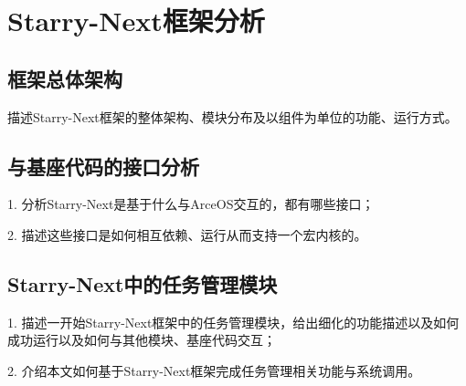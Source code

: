 
\chapter{Starry-Next框架分析}

\section{框架总体架构}

描述Starry-Next框架的整体架构、模块分布及以组件为单位的功能、运行方式。



\section{与基座代码的接口分析}

1. 分析Starry-Next是基于什么与ArceOS交互的，都有哪些接口；

2. 描述这些接口是如何相互依赖、运行从而支持一个宏内核的。



\section{Starry-Next中的任务管理模块}

1. 描述一开始Starry-Next框架中的任务管理模块，给出细化的功能描述以及如何成功运行以及如何与其他模块、基座代码交互；

2. 介绍本文如何基于Starry-Next框架完成任务管理相关功能与系统调用。


